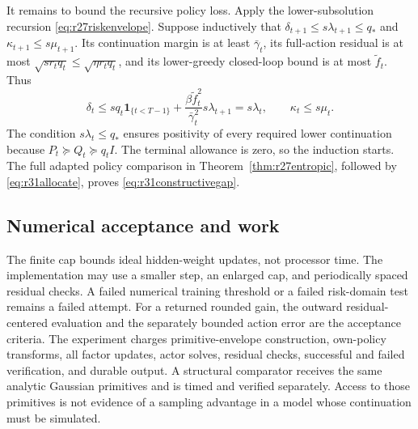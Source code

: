 It remains to bound the recursive policy loss. Apply the lower-subsolution
recursion \eqref{eq:r27riskenvelope}. Suppose inductively that
$\delta_{t+1}\leq s\lambda_{t+1}\leq q_*$ and
$\kappa_{t+1}\leq s\mu_{t+1}$. Its continuation margin is at least
$\bar\gamma_t$, its full-action residual is at most
$\sqrt{s r_tq_t}\leq\sqrt{\eta r_tq_t}$, and its lower-greedy closed-loop
bound is at most $\widetilde f_t$. Thus
\[
 \delta_t\leq s q_t\mathbf1_{\{t<T-1\}}
       +\frac{\beta\widetilde f_t^2}{\bar\gamma_t^2}s\lambda_{t+1}
       =s\lambda_t,
 \qquad \kappa_t\leq s\mu_t.
\]
The condition $s\lambda_t\leq q_*$ ensures positivity of every required
lower continuation because $P_t\succeq Q_t\succeq q_tI$.
The terminal allowance is zero, so the induction starts. The full adapted
policy comparison in Theorem~\ref{thm:r27entropic}, followed by
\eqref{eq:r31allocate}, proves \eqref{eq:r31constructivegap}.

\subsection{Numerical acceptance and work}
The finite cap bounds ideal hidden-weight updates, not processor time.
The implementation may use a smaller step, an enlarged cap, and periodically
spaced residual checks. A failed numerical training threshold or a failed
risk-domain test remains a failed attempt. For a returned rounded gain, the
outward residual-centered evaluation and the separately bounded action error
are the acceptance criteria. The experiment charges primitive-envelope
construction, own-policy transforms, all factor updates, actor solves,
residual checks, successful and failed verification, and durable output.
A structural comparator receives the same analytic Gaussian primitives and
is timed and verified separately. Access to those primitives is not evidence
of a sampling advantage in a model whose continuation must be simulated.
